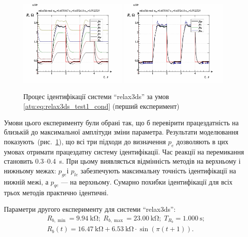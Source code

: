 \begin{figure}[htb!]
  \centerline{
    \includegraphics[width=0.48\textwidth]{p/relax3ds_read_id2_0-p_p.png}
    \hfill
    \includegraphics[width=0.48\textwidth]{p/relax3ds_read_id2_0-p_pp.png}
  }
\caption{Процес ідентифікації системи ``relax3ds'' за умов \ref{atu:eq:relax3ds_test1_cond} (перший експеримент)}
  \label{atu:f:relax3ds_id_0}
\end{figure}

Умови цього експерименту були обрані так, що б перевірити
працездатність на близькій до максимальної амплітуди зміни
параметра. Результати моделювання показують~(рис.~\ref{atu:f:relax3ds_id_0}),
що всі три підходи до визначення
$ p_e $ дозволяють в цих умовах отримати працездатну систему
ідентифікації. Час реакції на перемикання становить 0.3--0.4~s. При
цьому виявляється відмінність методів на верхньому і нижньому
межах: $p_{ge} $і
$ p_{le} $ забезпечують максимальну точність ідентифікації на нижній межі, а
$ p_{qe} $ --- на верхньому. Сумарно похибки ідентифікації для всіх трьох методів практично ідентичні.


Параметри другого експерименту для системи ``relax3ds'':
%
\begin{equation}
  \begin{array}{c}
    R_{b,\min} = \SI{9.94}{\kilo\ohm};
    \;
    R_{b,\max} = \SI{23.00}{\kilo\ohm};
    \;
    T_{R_b} = \SI{1.000}{\second};
  \\
    R_b(t) = \SI{16.47}{\kilo\ohm} + \SI{6.53}{\kilo\ohm} \cdot \sin( \pi ( t + 1 ) ).
  \end{array}
  \label{atu:eq:relax3ds_test2_cond}
\end{equation}

